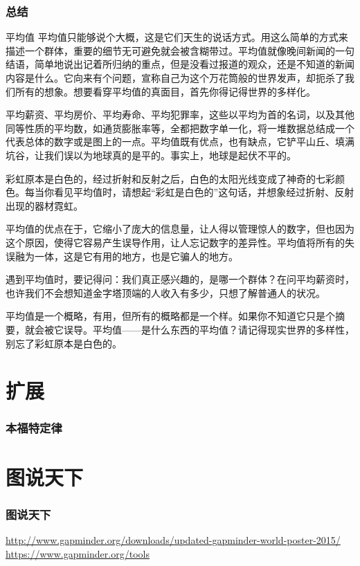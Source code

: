 \begin{frame}
  \frametitle{总结}
  \begin{block}{平均值}
    平均值只能够说个大概，这是它们天生的说话方式。用这么简单的方式来描述一个群体，重要的细节无可避免就会被含糊带过。平均值就像晚间新闻的一句结语，简单地说出记着所归纳的重点，但是没看过报道的观众，还是不知道的新闻内容是什么。它向来有个问题，宣称自己为这个万花筒般的世界发声，却扼杀了我们所有的想象。想要看穿平均值的真面目，首先你得记得世界的多样化。

    平均薪资、平均房价、平均寿命、平均犯罪率，这些以平均为首的名词，以及其他同等性质的平均数，如通货膨胀率等，全都把数字单一化，将一堆数据总结成一个代表总体的数字或是图上的一点。平均值既有优点，也有缺点，它铲平山丘、填满坑谷，让我们误以为地球真的是平的。事实上，地球是起伏不平的。

    彩虹原本是白色的，经过折射和反射之后，白色的太阳光线变成了神奇的七彩颜色。每当你看见平均值时，请想起“彩虹是白色的”这句话，并想象经过折射、反射出现的器材霓虹。

    平均值的优点在于，它缩小了庞大的信息量，让人得以管理惊人的数字，但也因为这个原因，使得它容易产生误导作用，让人忘记数字的差异性。平均值将所有的失误融为一体，这是它有用的地方，也是它骗人的地方。

    遇到平均值时，要记得问：我们真正感兴趣的，是哪一个群体？在问平均薪资时，也许我们不会想知道金字塔顶端的人收入有多少，只想了解普通人的状况。

    平均值是一个概略，有用，但所有的概略都是一个样。如果你不知道它只是个摘要，就会被它误导。平均值——是什么东西的平均值？请记得现实世界的多样性，别忘了彩虹原本是白色的。
  \end{block}
\end{frame}

\section{扩展}
\begin{frame}
  \frametitle{本福特定律}
\end{frame}

\section{图说天下}
\begin{frame}
  \frametitle{图说天下}
  \href{http://www.gapminder.org/downloads/updated-gapminder-world-poster-2015/}{http://www.gapminder.org/downloads/updated-gapminder-world-poster-2015/}
  \href{https://www.gapminder.org/tools}{https://www.gapminder.org/tools}
\end{frame}



